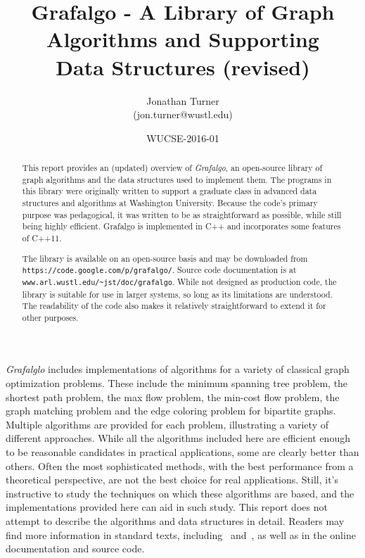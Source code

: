 \documentclass[11pt]{article}
\begin{document}
\title{\bf Grafalgo - A Library of Graph \\Algorithms 
and Supporting\\Data Structures (revised)}
 
\author{Jonathan Turner \\(jon.turner@wustl.edu)}
\date{\normalsize WUCSE-2016-01}
\maketitle

\begin{abstract}
This report provides an (updated) overview of {\sl Grafalgo}, an open-source library
of graph algorithms and the data structures used to implement them.
The programs in this library were originally written to support a graduate
class in advanced data structures and algorithms at Washington University.
Because the code's primary purpose was pedagogical, it was written to
be as straightforward as possible, while still being highly efficient.
Grafalgo is implemented in C++ and incorporates some features of C++11.

The library is available on an open-source basis and may be
downloaded from {\tt https://code.google.com/p/grafalgo/}.
Source code documentation is at {\tt www.arl.wustl.edu/\textasciitilde jst/doc/grafalgo}.
While not designed as production code, the library is suitable for
use in larger systems, so long as its limitations are understood.
The readability of the code also makes it relatively straightforward to extend it for other purposes.
\end{abstract}

\pagestyle{plain}

{\sl Grafalglo} includes implementations of algorithms for
a variety of classical graph optimization problems. These include the
minimum spanning tree problem, the shortest path problem,
the max flow problem, the min-cost flow problem, the graph matching
problem and the edge coloring problem for bipartite graphs. 
Multiple algorithms are provided for each problem, illustrating
a variety of different approaches. While all the algorithms included here
are efficient enough to be reasonable candidates in practical applications,
some are clearly better than others. Often the most sophisticated methods,
with the best performance from a theoretical perspective, are not the best
choice for real applications. Still, it's instructive to study the techniques
on which these algorithms are based, and the implementations provided
here can aid in such study. This report does not attempt to describe the
algorithms and data structures in detail. Readers may find more information
in standard texts, including~\cite{CLRS} and~\cite{TA83},
as well as in the online documentation and source code.
\end{document}
